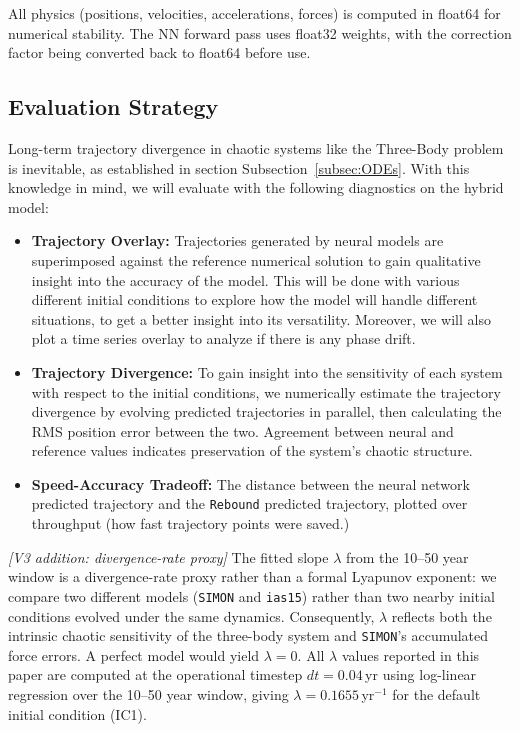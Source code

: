 \documentclass[12pt,a4paper]{article}
\newcommand{\simon}{\texttt{SIMON}}
\newcommand{\ias}{\texttt{ias15}}
\begin{document}
All physics (positions, velocities, accelerations, forces) is computed in float64 for numerical stability. The NN forward pass uses float32 weights, with the correction factor being converted back to float64 before use.

\subsection{Evaluation Strategy}
\label{subsec:eval}
Long-term trajectory divergence in chaotic systems like the Three-Body problem is inevitable, as established in section Subsection~\ref{subsec:ODEs}. With this knowledge in mind, we will evaluate with the following diagnostics on the hybrid model:

\begin{itemize}
    \item \textbf{Trajectory Overlay:} Trajectories generated by neural models are superimposed against the reference numerical solution to gain qualitative insight into the accuracy of the model. This will be done with various different initial conditions to explore how the model will handle different situations, to get a better insight into its versatility. Moreover, we will also plot a time series overlay to analyze if there is any phase drift.
    \item \textbf{Trajectory Divergence:} To gain insight into the sensitivity of each system with respect to the initial conditions, we numerically estimate the trajectory divergence by evolving predicted trajectories in parallel, then calculating the RMS position error between the two. Agreement between neural and reference values indicates preservation of the system's chaotic structure.
    \item \textbf{Speed-Accuracy Tradeoff:} The distance between the neural network predicted trajectory and the \texttt{Rebound} predicted trajectory, plotted over throughput (how fast trajectory points were saved.)
\end{itemize}

\noindent\textit{[V3 addition: divergence-rate proxy]} The fitted slope $\lambda$ from the 10--50 year window is a divergence-rate proxy rather than a formal Lyapunov exponent: we compare two different models (\simon{} and \ias{}) rather than two nearby initial conditions evolved under the same dynamics. Consequently, $\lambda$ reflects both the intrinsic chaotic sensitivity of the three-body system and \simon{}'s accumulated force errors. A perfect model would yield $\lambda = 0$. All $\lambda$ values reported in this paper are computed at the operational timestep $dt = 0.04$\,yr using log-linear regression over the 10--50 year window, giving $\lambda = 0.1655$\,yr$^{-1}$ for the default initial condition (IC1).
\end{document}
